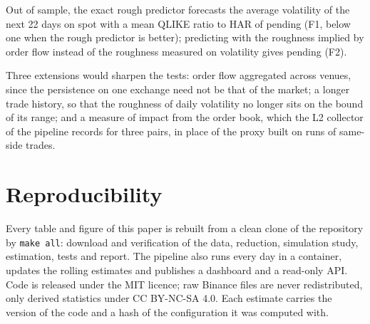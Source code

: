 \documentclass[11pt]{article}
\providecommand{\resultFOne}{pending}
\providecommand{\resultFTwo}{pending}
\begin{document}
Out of sample, the exact rough predictor forecasts the average volatility of the next 22
days on spot with a mean QLIKE ratio to HAR of \resultFOne{} (F1, below one when the rough
predictor is better); predicting with the roughness implied by order flow instead of the
roughness measured on volatility gives \resultFTwo{} (F2).

Three extensions would sharpen the tests: order flow aggregated across venues, since the
persistence on one exchange need not be that of the market; a longer trade history, so
that the roughness of daily volatility no longer sits on the bound of its range; and a
measure of impact from the order book, which the L2 collector of the pipeline records for
three pairs, in place of the proxy built on runs of same-side trades.

\appendix
\section{Reproducibility}
Every table and figure of this paper is rebuilt from a clean clone of the repository by
\texttt{make all}: download and verification of the data, reduction, simulation study,
estimation, tests and report. The pipeline also runs every day in a container, updates the
rolling estimates and publishes a dashboard and a read-only API. Code is released under
the MIT licence; raw Binance files are never redistributed, only derived statistics under
CC BY-NC-SA 4.0. Each estimate carries the version of the code and a hash of the
configuration it was computed with.



\end{document}
